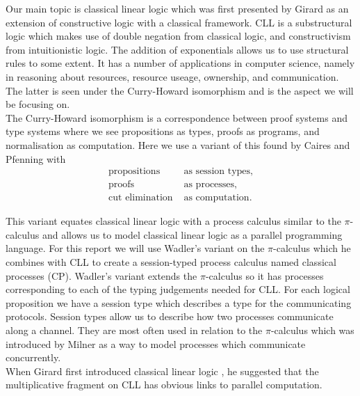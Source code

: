 \noindent
Our main topic is classical linear logic which was first presented by Girard as an extension of constructive logic 
with a classical framework. CLL is a substructural logic which makes use of double negation from classical logic, and 
constructivism from intuitionistic logic. The addition of exponentials allows us to use structural rules to some extent. 
It has a number of applications in computer science, namely in reasoning about resources, resource useage, ownership, 
and communication. The latter is seen under the Curry-Howard isomorphism and is the aspect we will be focusing on. \\

\noindent
The Curry-Howard isomorphism is a correspondence between proof systems and type systems where we see propositions as 
types, proofs as programs, and normalisation as computation. Here we use a variant of this found by Caires and Pfenning 
\cite{caires2010} with 
\begin{align*}
    \text{propositions }& \text{as session types,} \\
    \text{proofs } & \text{as processes,} \\
    \text{cut elimination } & \text{as computation.} 
\end{align*}

\noindent
This variant equates classical linear logic with a process calculus similar to the $\pi$-calculus and allows 
us to model classical linear logic as a parallel programming language. For this report we will use Wadler's 
\cite{wadler2014} variant on the $\pi$-calculus which he combines with CLL to create a session-typed process calculus 
named classical processes (CP). Wadler's variant extends the $\pi$-calculus so it has processes corresponding to 
each of the typing judgements needed for CLL. For each logical proposition we have a session type which 
describes a type for the communicating protocols. Session types  allow us to describe how two processes 
communicate along a channel. They are most often used in relation to the $\pi$-calculus which was introduced 
by Milner \cite{milner1992} as a way to model processes which communicate concurrently. \\

\noindent
When Girard first introduced classical linear logic \cite{girard1987}, he suggested that the multiplicative fragment 
on CLL has obvious links to parallel computation. 

